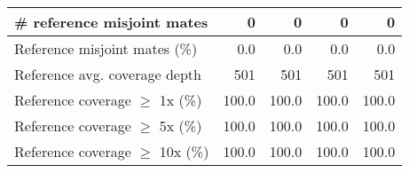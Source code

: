 \documentclass[12pt,a4paper]{article}
\begin{document}
\begin{table}[ht]
\begin{center}
\begin{tabular}{|l*{4}{|r}|}
\# reference misjoint mates & 0 & 0 & 0 & 0 \\ \hline
Reference misjoint mates (\%) & 0.0 & 0.0 & 0.0 & 0.0 \\ \hline
Reference avg. coverage depth & 501 & 501 & 501 & 501 \\ \hline
Reference coverage $\geq$ 1x (\%) & 100.0 & 100.0 & 100.0 & 100.0 \\ \hline
Reference coverage $\geq$ 5x (\%) & 100.0 & 100.0 & 100.0 & 100.0 \\ \hline
Reference coverage $\geq$ 10x (\%) & 100.0 & 100.0 & 100.0 & 100.0 \\ \hline
\end{tabular}
\end{center}
\end{table}
\end{document}

